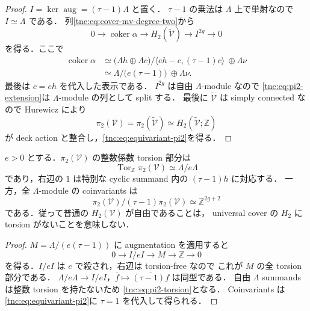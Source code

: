 \begin{proof}
$I=\ker\operatorname{aug}=(\tau-1)\Lambda$ と置く．
$\tau-1$ の乗法は $\Lambda$ 上で単射なので $I\simeq\Lambda$ である．
列\eqref{tnc:eq:cover-mv-degree-two}から
\begin{equation}\label{tnc:eq:pi2-extension}
 0\longrightarrow\operatorname{coker}\alpha
 \longrightarrow H_2(\widetilde{\mathcal V})
 \longrightarrow I^{2g}\longrightarrow0
\end{equation}
を得る．ここで
\begin{align*}
 \operatorname{coker}\alpha
 &\simeq
 \bigl(\Lambda h\oplus\Lambda c\bigr)
   /\langle e h-c,(\tau-1)c\rangle\ \oplus\Lambda\nu\\
 &\simeq\Lambda/\bigl(e(\tau-1)\bigr)\ \oplus\Lambda\nu.
\end{align*}
最後は $c=e h$ を代入した表示である．
$I^{2g}$ は自由 $\Lambda$-module なので
\eqref{tnc:eq:pi2-extension}は $\Lambda$-module の列として split する．
最後に $\widetilde{\mathcal V}$ は simply connected なので
Hurewicz により
\[
 \pi_2(\mathcal V)=\pi_2(\widetilde{\mathcal V})
 \simeq H_2(\widetilde{\mathcal V};\mathbb Z)
\]
が deck action と整合し，\eqref{tnc:eq:equivariant-pi2}を得る．
\end{proof}

\begin{corollary}
\label{tnc:pi2-torsion}
$e>0$ とする．$\pi_2(\mathcal V)$ の整数係数 torsion 部分は
\begin{equation}\label{tnc:eq:pi2-torsion}
 \operatorname{Tor}_{\mathbb Z}\pi_2(\mathcal V)
 \simeq\Lambda/e\Lambda
\end{equation}
であり，右辺の $1$ は特別な cyclic summand 内の $(\tau-1)h$ に対応する．
一方，全 $\Lambda$-module の coinvariants は
\[
 \pi_2(\mathcal V)/(\tau-1)\pi_2(\mathcal V)
 \simeq\mathbb Z^{2g+2}
\]
である．従って普通の $H_2(\mathcal V)$ が自由であることは，
universal cover の $H_2$ に torsion がないことを意味しない．
\end{corollary}
\begin{proof}
$M=\Lambda/(e(\tau-1))$ に augmentation を適用すると
\[
 0\longrightarrow I/eI\longrightarrow M
 \longrightarrow\mathbb Z\longrightarrow0
\]
を得る．$I/eI$ は $e$ で殺され，右辺は torsion-free なので
これが $M$ の全 torsion 部分である．
$\Lambda/e\Lambda\to I/eI$，$\overline f\mapsto\overline{(\tau-1)f}$ は同型である．
自由 $\Lambda$ summands は整数 torsion を持たないため
\eqref{tnc:eq:pi2-torsion}となる．
Coinvariants は\eqref{tnc:eq:equivariant-pi2}に $\tau=1$ を代入して得られる．
\end{proof}

